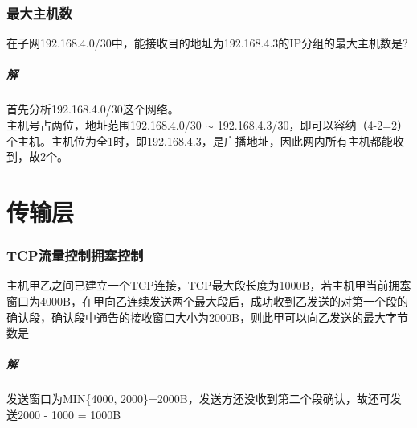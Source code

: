 \subsubsection{最大主机数}
在子网192.168.4.0/30中，能接收目的地址为192.168.4.3的IP分组的最大主机数是?

\subparagraph{解}
首先分析192.168.4.0/30这个网络。 \\
主机号占两位，地址范围192.168.4.0/30 \(\sim\) 192.168.4.3/30，即可以容纳（4-2=2）个主机。主机位为全1时，即192.168.4.3，是广播地址，因此网内所有主机都能收到，故2个。


\section{传输层}

\subsubsection{TCP流量控制拥塞控制}
主机甲乙之间已建立一个TCP连接，TCP最大段长度为1000B，若主机甲当前拥塞窗口为4000B，在甲向乙连续发送两个最大段后，成功收到乙发送的对第一个段的确认段，确认段中通告的接收窗口大小为2000B，则此甲可以向乙发送的最大字节数是

\subparagraph{解}
发送窗口为MIN\{4000, 2000\}=2000B，发送方还没收到第二个段确认，故还可发送2000 - 1000 = 1000B


